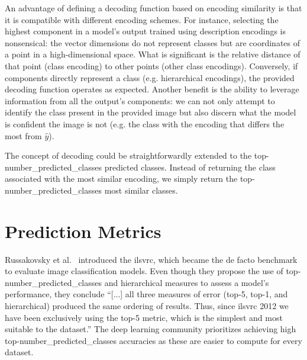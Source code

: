 An advantage of defining a decoding function based on encoding similarity is that it is compatible with different encoding schemes. For instance, selecting the highest component in a model's output trained using description encodings is nonsensical: the vector dimensions do not represent classes but are coordinates of a point in a high-dimensional space. What is significant is the relative distance of that point (class encoding) to other points (other class encodings).
Conversely, if components directly represent a class (e.g. hierarchical encodings), the provided decoding function operates as expected.
Another benefit is the ability to leverage information from all the output's components: we can not only attempt to identify the class present in the provided image but also discern what the model is confident the image is not (e.g. the class with the encoding that differs the most from $\hat{y}$).\medskip

The concept of decoding could be straightforwardly extended to the top-\gls{number_predicted_classes} predicted classes. Instead of returning the class associated with the most similar encoding, we simply return the top-\gls{number_predicted_classes} most similar classes.

\section{Prediction Metrics}
\label{sec:prediction-metrics}
Russakovsky et al.~\cite{ImagenetLargeRussak2014} introduced the \acrfull{ilsvrc}, which became the de facto benchmark to evaluate image classification models.
Even though they propose the use of top-\gls{number_predicted_classes} and hierarchical measures to assess a model's performance, they conclude ``[...] all three measures of error (top-5, top-1, and hierarchical) produced the same ordering of results. Thus, since \acrshort{ilsvrc} 2012 we have been exclusively using the top-5 metric, which is the simplest and most suitable to the dataset.''
The deep learning community prioritizes achieving high top-\gls{number_predicted_classes} accuracies as these are easier to compute for every dataset.

